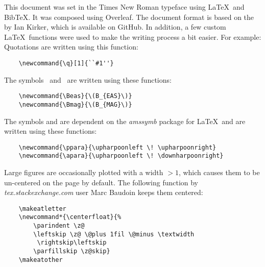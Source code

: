% 

This document was set in the Times New Roman typeface using \LaTeX\ and Bib\TeX. It was composed using Overleaf. The document format is based on the  by Ian Kirker, which is available on GitHub\cite{kirker2014}. In addition, a few custom \LaTeX\ functions were used to make the writing process a bit easier. For example:
\\

\noindent Quotations are written using this function:
\begin{verbatim}
    \newcommand{\q}[1]{``#1''}
\end{verbatim}
The symbols \Beas\ and \Bmag\ are written using these functions:
\begin{verbatim}
    \newcommand{\Beas}{\(B_{EAS}\)}
    \newcommand{\Bmag}{\(B_{MAG}\)}
\end{verbatim}
The symbols \q{\(\ppara\)} and \q{\(\apara\)} are dependent on the \textit{amssymb} package for \LaTeX\ and are written using these functions: 
\begin{verbatim}
    \newcommand{\ppara}{\upharpoonleft \! \upharpoonright}
    \newcommand{\apara}{\upharpoonleft \! \downharpoonright}
\end{verbatim}
Large figures are occasionally plotted with a width \(>1\), which causes them to be un-centered on the page by default. The following function by \textit{tex.stackexchange.com} user Marc Baudoin keeps them centered\cite{baudoin2011}:
\begin{verbatim}
    \makeatletter
    \newcommand*{\centerfloat}{%
        \parindent \z@
        \leftskip \z@ \@plus 1fil \@minus \textwidth
         \rightskip\leftskip
        \parfillskip \z@skip}
    \makeatother
\end{verbatim}

\vspace*{\fill}
\noindent {}\cite{ruth2019}



